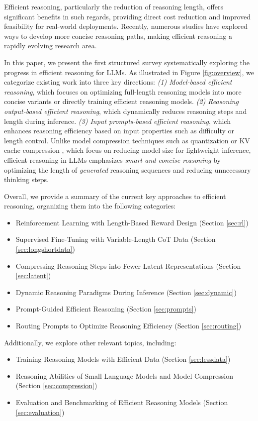 Efficient reasoning, particularly the reduction of reasoning length, offers significant benefits in such regards, providing direct cost reduction and improved feasibility for real-world deployments. Recently, numerous studies \cite{luo2025o1, yeo2025demystifying, han2024token, ma2025cot, hao2024training} have explored ways to develop more concise reasoning paths, making efficient reasoning a rapidly evolving research area.

In this paper, we present the first structured survey systematically exploring the progress in efficient reasoning for LLMs. As illustrated in Figure \ref{fig:overview}, we categorize existing work into three key directions:  
\textit{(1) Model-based efficient reasoning}, which focuses on optimizing full-length reasoning models into more concise variants or directly training efficient reasoning models.  
\textit{(2) Reasoning output-based efficient reasoning}, which dynamically reduces reasoning steps and length during inference.  
\textit{(3) Input prompts-based efficient reasoning}, which enhances reasoning efficiency based on input properties such as difficulty or length control. 
Unlike model compression techniques such as quantization \cite{xiao2023smoothquant, frantar2023gptq, lin2024awq} or KV cache compression \cite{zhang2023h2o, liu2024kivi, shi2024keepcost, yuan2024lcbench, hao2025omnikv}, which focus on reducing model size for lightweight inference, efficient reasoning in LLMs emphasizes \textit{smart and concise reasoning} by optimizing the length of \textit{generated} reasoning sequences and reducing unnecessary thinking steps.

Overall, we provide a summary of the current key approaches to efficient reasoning, organizing them into the following categories:

\begin{itemize}
    \item Reinforcement Learning with Length-Based Reward Design (Section \ref{sec:rl})
    \item Supervised Fine-Tuning with Variable-Length CoT Data (Section \ref{sec:longshortdata})
    \item Compressing Reasoning Steps into Fewer Latent Representations (Section \ref{sec:latent})
    \item Dynamic Reasoning Paradigms During Inference (Section \ref{sec:dynamic})
    \item Prompt-Guided Efficient Reasoning (Section \ref{sec:prompts})
    \item Routing Prompts to Optimize Reasoning Efficiency (Section \ref{sec:routing})
\end{itemize}

Additionally, we explore other relevant topics, including:

\begin{itemize}
    \item Training Reasoning Models with Efficient Data (Section \ref{sec:lessdata})
    \item Reasoning Abilities of Small Language Models and Model Compression (Section \ref{sec:compression}) 
    \item Evaluation and Benchmarking of Efficient Reasoning Models (Section \ref{sec:evaluation})
\end{itemize}
